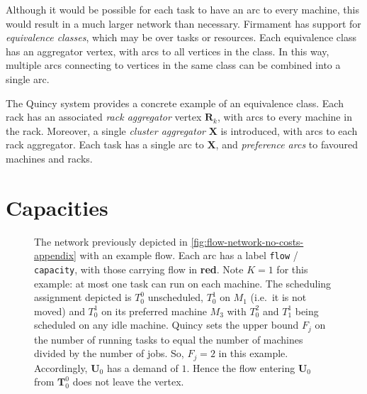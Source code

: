 Although it would be possible for each task to have an arc to every machine, this would result in a much larger network than necessary. Firmament has support for \emph{equivalence classes}, which may be over tasks or resources\footnotemark. Each equivalence class has an aggregator vertex, with arcs to all vertices in the class. In this way, multiple arcs connecting to vertices in the same class can be combined into a single arc.

The Quincy system provides a concrete example of an equivalence class. Each rack has an associated \emph{rack aggregator} vertex $\mathbf{R}_k$, with arcs to every machine in the rack. Moreover, a single \emph{cluster aggregator} $\mathbf{X}$ is introduced, with arcs to each rack aggregator. Each task has a single arc to $\mathbf{X}$, and \emph{preference arcs} to favoured machines and racks.

\section{Capacities} \label{appendix:flow-scheduling:capacities}

\begin{figure}
    \centering
    
    \caption[Capacities on a Quincy scheduling flow network]{The network previously depicted in \cref{fig:flow-network-no-costs-appendix} with an example flow. Each arc has a label \texttt{flow} / \texttt{capacity}, with those carrying flow in \textbf{\color{red} red}. Note $K=1$ for this example: at most one task can run on each machine. The scheduling assignment depicted is $T^0_0$ unscheduled, $T_0^1$ on $M_1$ (i.e.\ it is not moved) and $T_0^1$ on its preferred machine $M_3$ with $T_0^2$ and $T_1^1$ being scheduled on any idle machine. \newline \newline
    Quincy sets the upper bound $F_j$ on the number of running tasks to equal the number of machines divided by the number of jobs. So, $F_j = 2$ in this example. Accordingly, $\mathbf{U}_0$ has a demand of $1$. Hence the flow entering $\mathbf{U}_0$ from $\mathbf{T}_0^0$ does not leave the vertex.}
    \label{fig:flow-network-capacities}
\end{figure}

